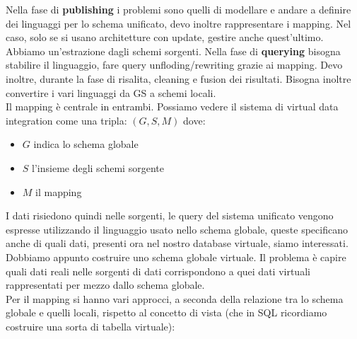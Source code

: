Nella fase di \textbf{publishing} i problemi sono quelli di modellare e andare a definire  dei linguaggi per lo schema unificato, devo inoltre rappresentare i mapping. Nel caso, solo se si usano architetture con update, gestire anche quest'ultimo. Abbiamo un'estrazione dagli schemi sorgenti.
Nella fase di \textbf{querying} bisogna stabilire il linguaggio, fare query unfloding/rewriting grazie ai mapping. Devo inoltre, durante la fase di risalita, cleaning e fusion dei risultati. Bisogna inoltre convertire i vari linguaggi da GS a schemi locali.\\ 

Il mapping è centrale in entrambi. Possiamo vedere il sistema di virtual data integration come una tripla: $(G,S,M)$ dove:
\begin{itemize}
  \item $G$ indica lo schema globale
  \item $S$ l'insieme degli schemi sorgente
  \item $M$ il mapping
\end{itemize}
I dati risiedono quindi nelle sorgenti, le query del sistema unificato vengono espresse utilizzando il linguaggio usato nello schema globale, queste specificano anche di quali dati, presenti ora nel nostro database virtuale, siamo interessati. Dobbiamo appunto costruire uno schema globale virtuale. Il problema è capire quali dati reali nelle sorgenti di dati corrispondono a quei dati virtuali rappresentati per mezzo dallo schema globale. \\ %
Per il mapping si hanno vari approcci, a seconda della relazione tra lo schema globale e quelli locali, rispetto al concetto di vista (che in SQL ricordiamo costruire una sorta di tabella virtuale):
